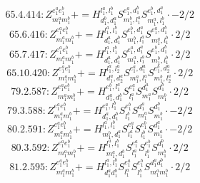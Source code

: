 \documentclass[letterpaper,10pt,fleqn,leqno,onecolumn]{article}
\begin{document}
\begin{equation} \;\;\;\;\;\;  65.4.414: Z^{e_{1}^{a}e_{1}^{b}}_{m_{1}^{a}m_{1}^{b}}+=H^{l_{1}^{a},l_{1}^{b}}_{d_{1}^{b},d_{1}^{a}}S^{e_{1}^{a},d_{1}^{b}}_{m_{1}^{b},l_{1}^{a}}S^{e_{1}^{b},d_{1}^{a}}_{m_{1}^{a},l_{1}^{b}}\cdot -2/2 \end{equation}
\begin{equation} \;\;\;\;\;\;  65.6.416: Z^{e_{1}^{a}e_{1}^{b}}_{m_{1}^{a}m_{1}^{b}}+=H^{l_{1}^{a},l_{1}^{b}}_{d_{1}^{a},d_{1}^{b}}S^{e_{1}^{b},d_{1}^{a}}_{m_{1}^{b},l_{1}^{a}}S^{e_{1}^{a},d_{1}^{b}}_{m_{1}^{a},l_{1}^{b}}\cdot 2/2 \end{equation}
\begin{equation} \;\;\;\;\;\;  65.7.417: Z^{e_{1}^{a}e_{1}^{b}}_{m_{1}^{a}m_{1}^{b}}+=H^{l_{1}^{a},l_{1}^{b}}_{d_{1}^{a},d_{1}^{b}}S^{e_{1}^{a},d_{1}^{a}}_{m_{1}^{a},l_{1}^{a}}S^{e_{1}^{b},d_{1}^{b}}_{m_{1}^{b},l_{1}^{b}}\cdot 2/2 \end{equation}
\begin{equation} \;\;\;\;\;\;  65.10.420: Z^{e_{1}^{a}e_{1}^{b}}_{m_{1}^{a}m_{1}^{b}}+=H^{l_{1}^{a},l_{2}^{a}}_{d_{1}^{a},d_{2}^{a}}S^{e_{1}^{a},d_{1}^{a}}_{m_{1}^{a},l_{1}^{a}}S^{e_{1}^{b},d_{2}^{a}}_{m_{1}^{b},l_{2}^{a}}\cdot 2/2 \end{equation}
\begin{equation} \;\;\;\;\;\;  79.2.587: Z^{e_{1}^{a}e_{1}^{b}}_{m_{1}^{a}m_{1}^{b}}+=H^{e_{1}^{b},l_{1}^{a}}_{d_{1}^{a},d_{1}^{b}}S^{e_{1}^{a}}_{l_{1}^{a}}S^{d_{1}^{a}}_{m_{1}^{a}}S^{d_{1}^{b}}_{m_{1}^{b}}\cdot 2/2 \end{equation}
\begin{equation} \;\;\;\;\;\;  79.3.588: Z^{e_{1}^{a}e_{1}^{b}}_{m_{1}^{a}m_{1}^{b}}+=H^{e_{1}^{a},l_{1}^{b}}_{d_{1}^{a},d_{1}^{b}}S^{e_{1}^{b}}_{l_{1}^{b}}S^{d_{1}^{a}}_{m_{1}^{a}}S^{d_{1}^{b}}_{m_{1}^{b}}\cdot -2/2 \end{equation}
\begin{equation} \;\;\;\;\;\;  80.2.591: Z^{e_{1}^{a}e_{1}^{b}}_{m_{1}^{a}m_{1}^{b}}+=H^{l_{1}^{a},l_{1}^{b}}_{m_{1}^{b},d_{1}^{a}}S^{e_{1}^{a}}_{l_{1}^{a}}S^{e_{1}^{b}}_{l_{1}^{b}}S^{d_{1}^{a}}_{m_{1}^{a}}\cdot -2/2 \end{equation}
\begin{equation} \;\;\;\;\;\;  80.3.592: Z^{e_{1}^{a}e_{1}^{b}}_{m_{1}^{a}m_{1}^{b}}+=H^{l_{1}^{a},l_{1}^{b}}_{m_{1}^{a},d_{1}^{b}}S^{e_{1}^{a}}_{l_{1}^{a}}S^{e_{1}^{b}}_{l_{1}^{b}}S^{d_{1}^{b}}_{m_{1}^{b}}\cdot 2/2 \end{equation}
\begin{equation} \;\;\;\;\;\;  81.2.595: Z^{e_{1}^{a}e_{1}^{b}}_{m_{1}^{a}m_{1}^{b}}+=H^{l_{1}^{a},l_{1}^{b}}_{d_{1}^{a}d_{1}^{b}}S^{e_{1}^{a}}_{l_{1}^{a}}S^{e_{1}^{b}}_{l_{1}^{b}}S^{d_{1}^{a}d_{1}^{b}}_{m_{1}^{a}m_{1}^{b}}\cdot 2/2 \end{equation}
\end{document}
